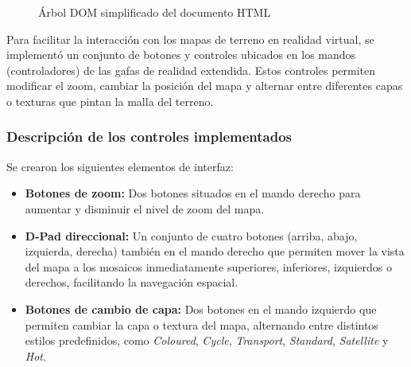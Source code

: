 \documentclass[a4paper, 12pt]{book}
\begin{document}
\begin{figure}[H]
\centering
{}
\caption{Árbol DOM simplificado del documento HTML}
\end{figure}

Para facilitar la interacción con los mapas de terreno en realidad virtual, se implementó un conjunto de botones y controles ubicados en los mandos (controladores) de las gafas de realidad extendida. Estos controles permiten modificar el zoom, cambiar la posición del mapa y alternar entre diferentes capas o texturas que pintan la malla del terreno.

\subsubsection*{Descripción de los controles implementados}

Se crearon los siguientes elementos de interfaz:

\begin{itemize}
    \item \textbf{Botones de zoom:} Dos botones situados en el mando derecho para aumentar y disminuir el nivel de zoom del mapa.
    \item \textbf{D-Pad direccional:} Un conjunto de cuatro botones (arriba, abajo, izquierda, derecha) también en el mando derecho que permiten mover la vista del mapa a los mosaicos inmediatamente superiores, inferiores, izquierdos o derechos, facilitando la navegación espacial.
    \item \textbf{Botones de cambio de capa:} Dos botones en el mando izquierdo que permiten cambiar la capa o textura del mapa, alternando entre distintos estilos predefinidos, como \textit{Coloured}, \textit{Cycle}, \textit{Transport}, \textit{Standard}, \textit{Satellite} y \textit{Hot}.
\end{itemize}
\end{document}
